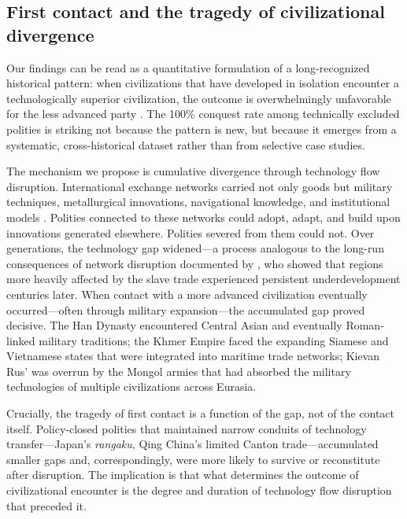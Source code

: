 \documentclass[pdflatex,sn-basic]{sn-jnl}
\theoremstyle{thmstyleone}%
\theoremstyle{thmstyletwo}%
\theoremstyle{thmstylethree}%
\begin{document}
\subsection{First contact and the tragedy of civilizational divergence}\label{sec:disc-firstcontact}

Our findings can be read as a quantitative formulation of a long-recognized historical pattern: when civilizations that have developed in isolation encounter a technologically superior civilization, the outcome is overwhelmingly unfavorable for the less advanced party \citep{Diamond1997, DiamondBellwood2003}. The 100\% conquest rate among technically excluded polities is striking not because the pattern is new, but because it emerges from a systematic, cross-historical dataset rather than from selective case studies.

The mechanism we propose is cumulative divergence through technology flow disruption. International exchange networks carried not only goods but military techniques, metallurgical innovations, navigational knowledge, and institutional models \citep{Mokyr2002, Pomeranz2000}. Polities connected to these networks could adopt, adapt, and build upon innovations generated elsewhere. Polities severed from them could not. Over generations, the technology gap widened---a process analogous to the long-run consequences of network disruption documented by \citet{Nunn2008}, who showed that regions more heavily affected by the slave trade experienced persistent underdevelopment centuries later. When contact with a more advanced civilization eventually occurred---often through military expansion---the accumulated gap proved decisive. The Han Dynasty encountered Central Asian and eventually Roman-linked military traditions; the Khmer Empire faced the expanding Siamese and Vietnamese states that were integrated into maritime trade networks; Kievan Rus' was overrun by the Mongol armies that had absorbed the military technologies of multiple civilizations across Eurasia.

Crucially, the tragedy of first contact is a function of the gap, not of the contact itself. Policy-closed polities that maintained narrow conduits of technology transfer---Japan's \emph{rangaku}, Qing China's limited Canton trade---accumulated smaller gaps and, correspondingly, were more likely to survive or reconstitute after disruption. The implication is that what determines the outcome of civilizational encounter is the degree and duration of technology flow disruption that preceded it.
\end{document}
